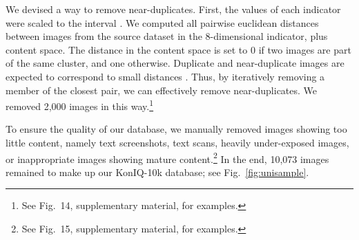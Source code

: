 \documentclass[10pt,journal,compsoc]{IEEEtran}
\begin{document}
We devised a way to remove near-duplicates. First, the values of each indicator were scaled to the interval . We computed all pairwise euclidean distances  between images  from the source dataset in the 8-dimensional indicator, plus content space. The distance in the content space is set to 0 if two images are part of the same cluster, and one otherwise. Duplicate and near-duplicate images  are expected to correspond to small distances . Thus, by iteratively removing a member of the closest pair, we can effectively remove near-duplicates. We removed 2,000 images in this way.\footnote{See Fig.~14, supplementary material, for examples.}







To ensure the quality of our database, we manually removed images showing too little content, namely text screenshots, text scans, heavily under-exposed images, or inappropriate images showing mature content.\footnote{See Fig.~15, supplementary material, for examples.}
In the end, 10,073 images remained to make up our KonIQ-10k database; see Fig.~\ref{fig:unisample}.
\end{document}
